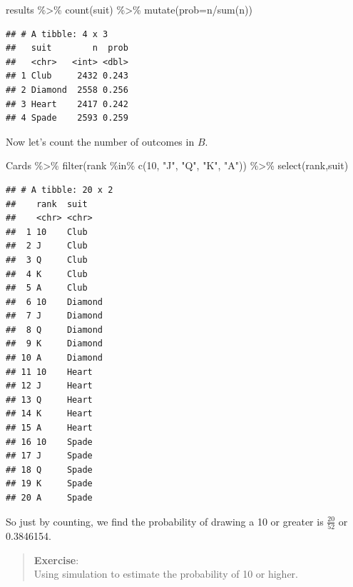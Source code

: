 \documentclass[
]{book}
\newenvironment{Shaded}{\begin{snugshade}}{\end{snugshade}}
\newcommand{\AttributeTok}[1]{\textcolor[rgb]{0.77,0.63,0.00}{#1}}
\newcommand{\DecValTok}[1]{\textcolor[rgb]{0.00,0.00,0.81}{#1}}
\newcommand{\FunctionTok}[1]{\textcolor[rgb]{0.00,0.00,0.00}{#1}}
\newcommand{\NormalTok}[1]{#1}
\newcommand{\SpecialCharTok}[1]{\textcolor[rgb]{0.00,0.00,0.00}{#1}}
\newcommand{\StringTok}[1]{\textcolor[rgb]{0.31,0.60,0.02}{#1}}
\begin{document}
\begin{Shaded}
\begin{Highlighting}[]
\NormalTok{results }\SpecialCharTok{\%\textgreater{}\%}
  \FunctionTok{count}\NormalTok{(suit) }\SpecialCharTok{\%\textgreater{}\%}
  \FunctionTok{mutate}\NormalTok{(}\AttributeTok{prob=}\NormalTok{n}\SpecialCharTok{/}\FunctionTok{sum}\NormalTok{(n))}
\end{Highlighting}
\end{Shaded}

\begin{verbatim}
## # A tibble: 4 x 3
##   suit        n  prob
##   <chr>   <int> <dbl>
## 1 Club     2432 0.243
## 2 Diamond  2558 0.256
## 3 Heart    2417 0.242
## 4 Spade    2593 0.259
\end{verbatim}

Now let's count the number of outcomes in \(B\).

\begin{Shaded}
\begin{Highlighting}[]
\NormalTok{Cards }\SpecialCharTok{\%\textgreater{}\%}
  \FunctionTok{filter}\NormalTok{(rank }\SpecialCharTok{\%in\%} \FunctionTok{c}\NormalTok{(}\DecValTok{10}\NormalTok{, }\StringTok{"J"}\NormalTok{, }\StringTok{"Q"}\NormalTok{, }\StringTok{"K"}\NormalTok{, }\StringTok{"A"}\NormalTok{)) }\SpecialCharTok{\%\textgreater{}\%}
  \FunctionTok{select}\NormalTok{(rank,suit)}
\end{Highlighting}
\end{Shaded}

\begin{verbatim}
## # A tibble: 20 x 2
##    rank  suit   
##    <chr> <chr>  
##  1 10    Club   
##  2 J     Club   
##  3 Q     Club   
##  4 K     Club   
##  5 A     Club   
##  6 10    Diamond
##  7 J     Diamond
##  8 Q     Diamond
##  9 K     Diamond
## 10 A     Diamond
## 11 10    Heart  
## 12 J     Heart  
## 13 Q     Heart  
## 14 K     Heart  
## 15 A     Heart  
## 16 10    Spade  
## 17 J     Spade  
## 18 Q     Spade  
## 19 K     Spade  
## 20 A     Spade
\end{verbatim}

So just by counting, we find the probability of drawing a 10 or greater is \(\frac{20}{52}\) or 0.3846154.

\begin{quote}
\textbf{Exercise}:\\
Using simulation to estimate the probability of 10 or higher.
\end{quote}
\end{document}
